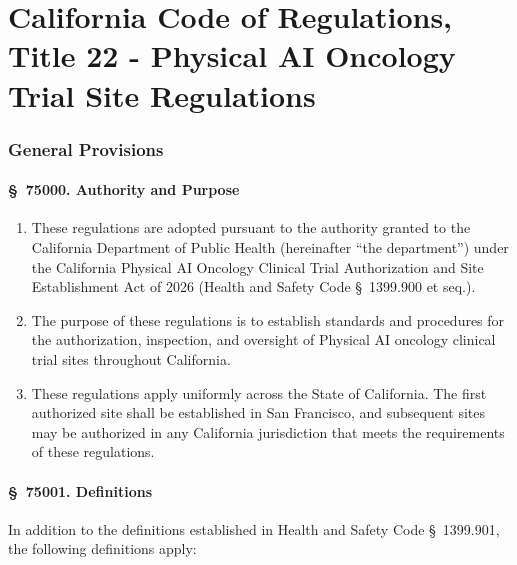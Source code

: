 

\part{California Code of Regulations, Title 22 - Physical AI Oncology Trial Site Regulations}
\setcounter{section}{0}

\section{General Provisions}

\subsection{\S~75000. Authority and Purpose}

\begin{enumerate}[label=(\alph*)]
\item These regulations are adopted pursuant to the authority granted to the
  California Department of Public Health (hereinafter ``the department'') under
  the California Physical AI Oncology Clinical Trial Authorization and Site
  Establishment Act of 2026 (Health and Safety Code \S~1399.900 et seq.).

\item The purpose of these regulations is to establish standards and procedures
  for the authorization, inspection, and oversight of Physical AI oncology
  clinical trial sites throughout California.

\item These regulations apply uniformly across the State of California. The
  first authorized site shall be established in San Francisco, and subsequent
  sites may be authorized in any California jurisdiction that meets the
  requirements of these regulations.
\end{enumerate}

\subsection{\S~75001. Definitions}

In addition to the definitions established in Health and Safety Code
\S~1399.901, the following definitions apply:

